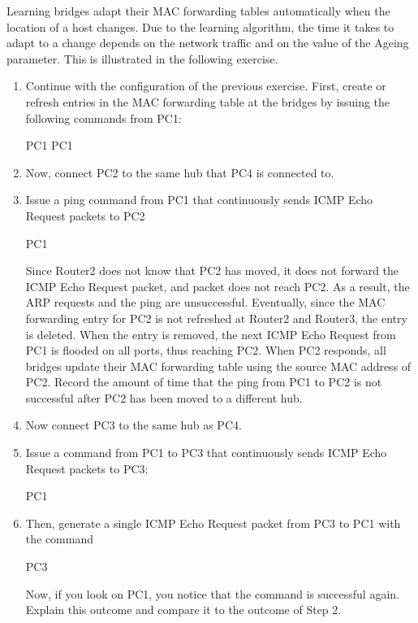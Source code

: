 Learning bridges adapt their MAC forwarding tables automatically when the location of a host changes. Due to the learning algorithm, the time it takes to adapt to a change depends on the network traffic and on the value of the Ageing parameter. This is illustrated in the following exercise.

\begin{enumerate}
	\item Continue with the configuration of the previous exercise. First, create or refresh entries in the MAC forwarding table at the bridges by issuing the following commands from PC1:
		\begin{cmdblock}
	PC1%
	PC1%
		\end{cmdblock}
	\item Now, connect PC2 to the same hub that PC4 is connected to.
	\item Issue a ping command from PC1 that continuously sends ICMP Echo Request packets to PC2
		\begin{cmdblock}
	PC1%
		\end{cmdblock}
		Since Router2 does not know that PC2 has moved, it does not forward the ICMP Echo Request packet, and packet does not reach PC2. As a result, the ARP requests and the ping are unsuccessful. Eventually, since the MAC forwarding entry for PC2 is not refreshed at Router2 and Router3, the entry is deleted. When the entry is removed, the next ICMP Echo Request from PC1 is flooded on all ports, thus reaching PC2. When PC2 responds, all bridges update their MAC forwarding table using the source MAC address of PC2.
		Record the amount of time that the ping from PC1 to PC2 is not successful after PC2 has been moved to a different hub.
	\item Now connect PC3 to the same hub as PC4.
	\item Issue a  command from PC1 to PC3 that continuously sends ICMP Echo Request packets to PC3:
		\begin{cmdblock}
	PC1%
		\end{cmdblock}
	\item Then, generate a single ICMP Echo Request packet from PC3 to PC1 with the command
		\begin{cmdblock}
	PC3%
		\end{cmdblock}
		Now, if you look on PC1, you notice that the  command is successful again. Explain this outcome and compare it to the outcome of Step 2.
\end{enumerate}

\begin{questions}
\end{questions}
